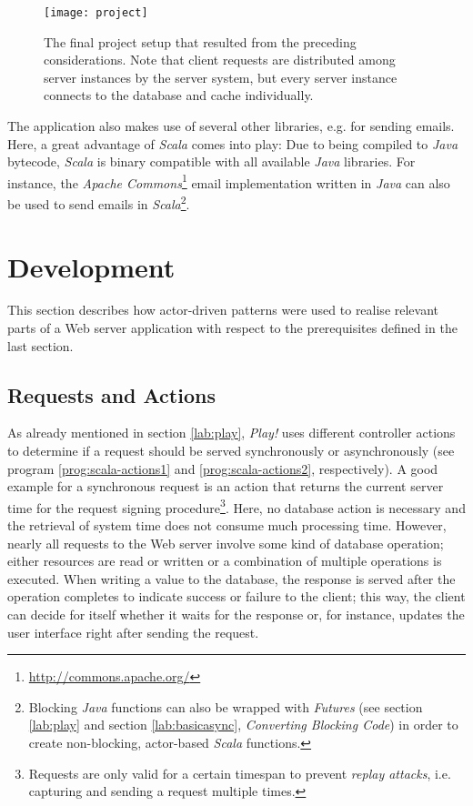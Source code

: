 \begin{figure}
\centering\small
\setlength{\tabcolsep}{0mm}
  \texttt{[image: project]}
\caption{
The final project setup that resulted from the preceding considerations. Note that client requests are distributed among server instances by the server system, but every server instance connects to the database and cache individually.
}
\label{fig:project}
\end{figure}

The application also makes use of several other libraries, e.g. for sending emails. Here, a great advantage of \textit{Scala} comes 
into play: Due to being compiled to \textit{Java} bytecode, \textit{Scala} is binary compatible with all available \textit{Java} libraries. For instance, the \textit{Apache Commons}\footnote{\url{http://commons.apache.org/}} email implementation written in \textit{Java} can also be used to send emails in \textit{Scala}\footnote{Blocking \textit{Java} functions can also be wrapped with \textit{Futures} (see section \ref{lab:play} and section \ref{lab:basicasync}, \textit{Converting Blocking Code}) in order to create non-blocking, actor-based \textit{Scala} functions.}.

\section{Development}
\label{lab:impl-dev}

This section describes how actor-driven patterns were used to realise relevant parts of a Web server application with respect to the prerequisites defined in the last section.

\subsection{Requests and Actions}
As already mentioned in section \ref{lab:play}, \textit{Play!} uses different controller actions to determine if a request should be served synchronously or asynchronously (see program \ref{prog:scala-actions1} and \ref{prog:scala-actions2}, respectively). A good example for a synchronous request is an action that returns the current server time for the request signing procedure\footnote{Requests are only valid for a certain timespan to prevent \textit{replay attacks}, i.e. capturing and sending a request multiple times.}. Here, no database action is necessary and the retrieval of system time does not consume much processing time. However, nearly all requests to the Web server involve some kind of database operation; either resources are read or written or a combination of multiple operations is executed. When writing a value to the database, the response is served after the operation completes to indicate success or failure to the client; this way, the client can decide for itself whether it waits for the response or, for instance, updates the user interface right after sending the request.

